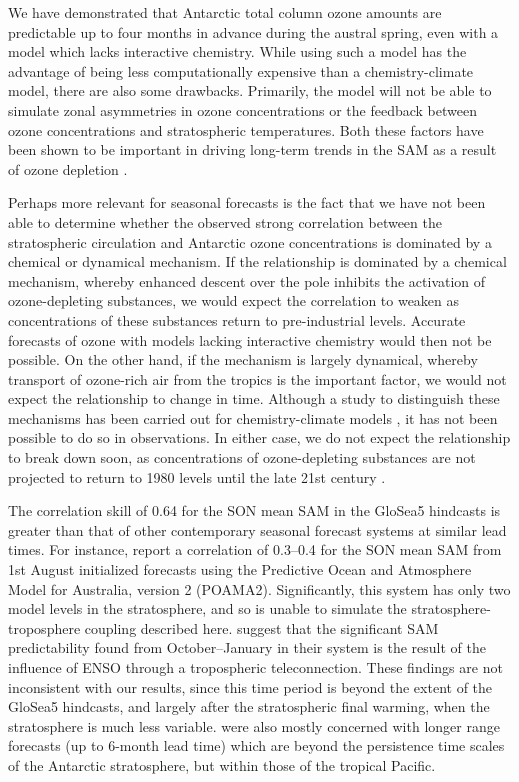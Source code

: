We have demonstrated that Antarctic total column ozone amounts are predictable up to four months in advance during the austral spring, even with a model which lacks interactive chemistry. While using such a model has the advantage of being less computationally expensive than a chemistry-climate model, there are also some drawbacks. Primarily, the model will not be able to simulate zonal asymmetries in ozone concentrations or the feedback between ozone concentrations and stratospheric temperatures. Both these factors have been shown to be important in driving long-term trends in the SAM as a result of ozone depletion \citep{Thompson2002a, Crook2008, Waugh2009}.  

Perhaps more relevant for seasonal forecasts is the fact that we have not been able to determine whether the observed strong correlation between the stratospheric circulation and Antarctic ozone concentrations is dominated by a chemical or dynamical mechanism. If the relationship is dominated by a chemical mechanism, whereby enhanced descent over the pole inhibits the activation of ozone-depleting substances, we would expect the correlation to weaken as concentrations of these substances return to pre-industrial levels. Accurate forecasts of ozone with models lacking interactive chemistry would then not be possible. On the other hand, if the mechanism is largely dynamical, whereby transport of ozone-rich air from the tropics is the important factor, we would not expect the relationship to change in time.  Although a study to distinguish these mechanisms has been carried out for chemistry-climate models \citep{Garny2011}, it has not been possible to do so in observations. In either case, we do not expect the relationship to break down soon, as concentrations of ozone-depleting substances are not projected to return to 1980 levels until the late 21st century \citep{WMO2010}. 

The correlation skill of 0.64 for the SON mean SAM in the GloSea5 hindcasts is greater than that of other contemporary seasonal forecast systems at similar lead times. For instance, \citet{Lim2013} report a correlation of 0.3--0.4 for the SON mean SAM from 1st August initialized forecasts using the Predictive Ocean and Atmosphere Model for Australia, version 2 (POAMA2). Significantly, this system has only two model levels in the stratosphere, and so is unable to simulate the stratosphere-troposphere coupling described here. \citet{Lim2013} suggest that the significant SAM predictability found from October--January in their system is the result of the influence of ENSO through a tropospheric teleconnection.  These findings are not inconsistent with our results, since this time period is beyond the extent of the GloSea5 hindcasts, and largely after the stratospheric final warming, when the stratosphere is much less variable. \citet{Lim2013} were also mostly concerned with longer range forecasts (up to 6-month lead time) which are beyond the persistence time scales of the Antarctic stratosphere, but within those of the tropical Pacific.

